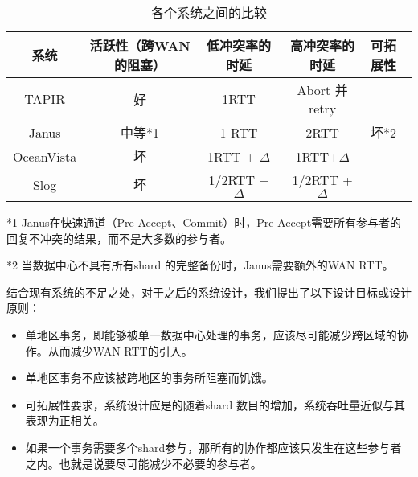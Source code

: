 \begin{table}[htb]
  \centering\small
  \caption{各个系统之间的比较}
  \label{tab:exampletable}
  \begin{tabular}{ccccl}
    \toprule
    系统   & 活跃性（跨WAN的阻塞） & 低冲突率的时延 & 高冲突率的时延 & 可拓展性 \\
    \midrule
    TAPIR & 好 & 1RTT & Abort 并 retry & \\
    Janus & 中等*1 & 1 RTT &2RTT &坏*2  \\
    OceanVista & 坏 & 1RTT + $\Delta$&  1RTT+$\Delta$ &     \\
    Slog & 坏 & 1/2RTT + $\Delta$  &  1/2RTT + $\Delta$  &  \\
    \bottomrule
  \end{tabular}
\end{table}

*1 Janus在快速通道（Pre-Accept、Commit）时，Pre-Accept需要所有参与者的回复不冲突的结果，而不是大多数的参与者。

*2 当数据中心不具有所有shard 的完整备份时，Janus需要额外的WAN RTT。


结合现有系统的不足之处，对于之后的系统设计，我们提出了以下设计目标或设计原则：

\begin{itemize}
\item 单地区事务，即能够被单一数据中心处理的事务，应该尽可能减少跨区域的协作。从而减少WAN RTT的引入。
\item 单地区事务不应该被跨地区的事务所阻塞而饥饿。
\item 可拓展性要求，系统设计应是的随着shard 数目的增加，系统吞吐量近似与其表现为正相关。
\item 如果一个事务需要多个shard参与，那所有的协作都应该只发生在这些参与者之内。也就是说要尽可能减少不必要的参与者。
\end{itemize}








